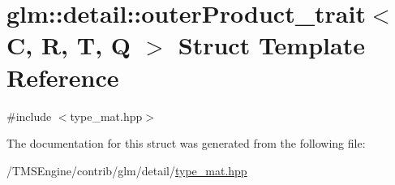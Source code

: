 \hypertarget{structglm_1_1detail_1_1outer_product__trait}{}\section{glm\+:\+:detail\+:\+:outer\+Product\+\_\+trait$<$ C, R, T, Q $>$ Struct Template Reference}
\label{structglm_1_1detail_1_1outer_product__trait}


{\ttfamily \#include $<$type\+\_\+mat.\+hpp$>$}



The documentation for this struct was generated from the following file\+:\begin{DoxyCompactItemize}
\item 
/\+T\+M\+S\+Engine/contrib/glm/detail/\hyperlink{type__mat_8hpp}{type\+\_\+mat.\+hpp}\end{DoxyCompactItemize}
